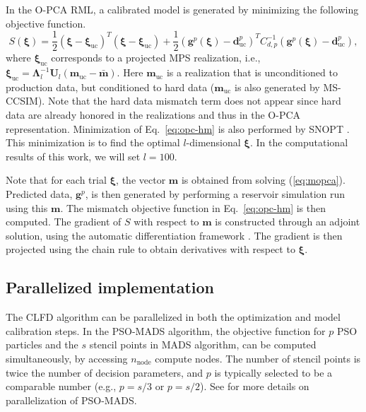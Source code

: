 \documentclass[11pt]{article}
\begin{document}
In the O-PCA RML,
a calibrated model is generated by minimizing the following objective function.
%
\begin{equation}  \label{eq:opc-hm}
S(\boldsymbol{\xi})=\frac{1}{2} (\boldsymbol{\xi}-\boldsymbol{\xi}_{\text{uc}})^T (\boldsymbol{\xi}-\boldsymbol{\xi}_{\text{uc}}) + \frac{1}{2}(\mathbf{g}^p(\boldsymbol{\xi})-\mathbf{d}_{\text{uc}}^{p})^T C_{d,p}^{-1} (\mathbf{g}^p(\boldsymbol{\xi})-\mathbf{d}_{\text{uc}}^{p}),
\end{equation}
%
where $\boldsymbol{\xi}_{\text{uc}}$ corresponds to a projected MPS realization, i.e.,
$\boldsymbol{\xi}_{\text{uc}} = \mathbf{\Lambda}_l^{-1} \mathbf{U}_l(\mathbf{m}_\text{uc}-\bar{\mathbf{m}})$.
Here $\mathbf{m}_\text{uc}$ is a realization that is unconditioned to production data, but conditioned to hard data ($\mathbf{m}_\text{uc}$
is also generated by MS-CCSIM).
Note that the hard data mismatch term
does not appear since hard data are already honored in the realizations and thus in the O-PCA representation.
Minimization of Eq.~\ref{eq:opc-hm} is also performed by SNOPT \citep{gill:05}. This minimization
is to find the optimal $l$-dimensional $\boldsymbol{\xi}$.
In the computational results of this work, we will set $l = 100$.

Note that for each trial $\boldsymbol{\xi}$, the vector $\mathbf{m}$ is obtained from solving (\ref{eq:mopca}).
Predicted data, $\mathbf{g}^p$, is then generated by performing a reservoir simulation run using this $\mathbf{m}$.
The mismatch objective function in Eq.~\ref{eq:opc-hm} is then computed.
The gradient of $S$ with respect to $\mathbf{m}$ is constructed
through an adjoint solution, using the automatic differentiation framework \citep{bukshtynov:15}.
The gradient is then projected using the chain rule to obtain derivatives
with respect to $\boldsymbol{\xi}$.


\subsection{Parallelized implementation}
The CLFD algorithm can be parallelized in both the optimization and model calibration steps.
In the PSO-MADS algorithm, the objective function for $p$ PSO particles and the $s$ stencil points in MADS algorithm,
can be computed simultaneously, by accessing
$n_{\text{node}}$ compute nodes. The number of stencil points is twice the number of decision parameters, and
$p$ is typically selected to be a comparable number (e.g., $p=s/3$ or $p=s/2$). See \citet{isebor:14a} for more details
on parallelization of PSO-MADS.
\end{document}
